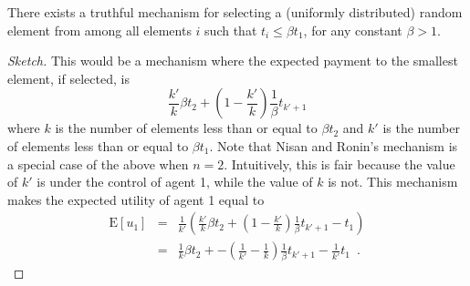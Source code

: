 \documentclass{article}
\newcommand{\E}{\mathrm{E}}
\begin{document}
\begin{conj}
There exists a truthful mechanism for selecting a (uniformly
distributed) random element from among all elements $i$ such that
$t_i\le \beta t_1$, for any constant $\beta > 1$.
\end{conj}

\begin{proof}[Sketch]
This would be a mechanism where the expected payment to the smallest
element, if selected, is
\[
\frac{k'}{k}\beta t_2 + \left(1-\frac{k'}{k} \right)\frac{1}{\beta}
t_{k'+1}
\]
where $k$ is the number of elements less than or equal to $\beta t_2$
and $k'$ is the number of elements less than or equal to $\beta t_1$.
Note that Nisan and Ronin's mechanism is a special case of the above
when $n=2$.  Intuitively, this is fair because the value of $k'$ is
under the control of agent 1, while the value of $k$ is not.
This mechanism makes the expected utility of agent 1 equal to
\begin{eqnarray*}
\E[u_1] & = & \frac{1}{k'}\left(\frac{k'}{k}\beta t_2 
   + \left(1-\frac{k'}{k} \right)\frac{1}{\beta} t_{k'+1}-t_1\right) \\
   & = & \frac{1}{k}\beta t_2 + -
\left(\frac{1}{k'}-\frac{1}{k}\right)\frac{1}{\beta}
t_{k'+1} - \frac{1}{k'}t_1 \enspace .
\end{eqnarray*}
\end{proof}
\end{document}
